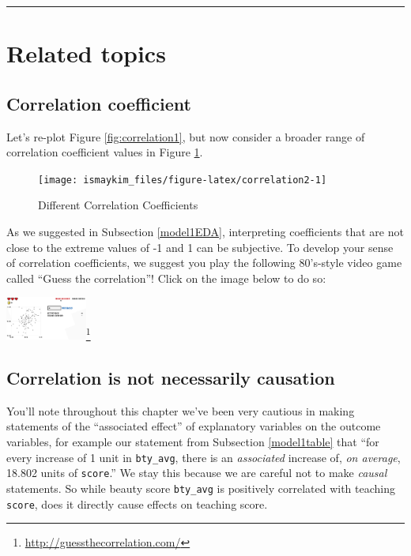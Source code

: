 \documentclass[12pt, krantz2,]{krantz}
\renewcommand{\href}[2]{#2\footnote{\url{#1}}}
\begin{document}
\begin{center}\rule{0.5\linewidth}{\linethickness}\end{center}

\hypertarget{related-topics}{%
\section{Related topics}\label{related-topics}}

\hypertarget{correlationcoefficient}{%
\subsection{Correlation coefficient}\label{correlationcoefficient}}

Let's re-plot Figure \ref{fig:correlation1}, but now consider a broader range of correlation coefficient values in Figure \ref{fig:correlation2}.

\begin{figure}

{\centering \texttt{[image: ismaykim\_files/figure-latex/correlation2-1]} 

}

\caption{Different Correlation Coefficients}\label{fig:correlation2}
\end{figure}

As we suggested in Subsection \ref{model1EDA}, interpreting coefficients that are not close to the extreme values of -1 and 1 can be subjective. To develop your sense of correlation coefficients, we suggest you play the following 80's-style video game called ``Guess the correlation''! Click on the image below to do so:

\begin{center}
\href{http://guessthecorrelation.com/}{\includegraphics[width=0.2\textwidth]{images/guess_the_correlation.png}}
\end{center}

\hypertarget{correlation-is-not-causation}{%
\subsection{Correlation is not necessarily causation}\label{correlation-is-not-causation}}

You'll note throughout this chapter we've been very cautious in making statements of the ``associated effect'' of explanatory variables on the outcome variables, for example our statement from Subsection \ref{model1table} that ``for every increase of 1 unit in \texttt{bty\_avg}, there is an \emph{associated} increase of, \emph{on average}, 18.802 units of \texttt{score}.'' We stay this because we are careful not to make \emph{causal} statements. So while beauty score \texttt{bty\_avg} is positively correlated with teaching \texttt{score}, does it directly cause effects on teaching score.
\end{document}
